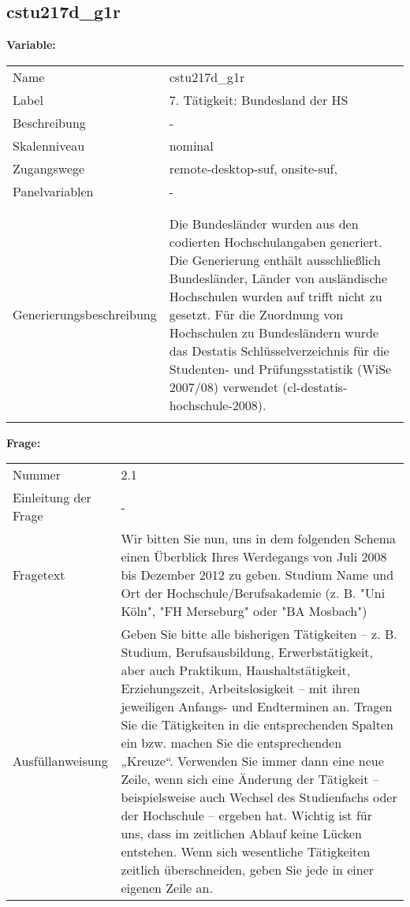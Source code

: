 	
	
	\subsection{cstu217d\_g1r}
	\label{subSection:cstu217d_g1r}

	\noindent\textbf{Variable:}\\
		\begin{tabular}{lL{11.3cm}}
			\label{tableVariable:cstu217d_g1r}
			Name & cstu217d\_g1r \\
			Label & 7. Tätigkeit: Bundesland der HS \\
			Beschreibung & - \\
			Skalenniveau & nominal \\
			Zugangswege &
				remote-desktop-suf,
				onsite-suf,
 \\
			Panelvariablen & -
			 \\
			 \\
 \\
					Generierungsbeschreibung & Die Bundesländer wurden aus den codierten Hochschulangaben generiert. Die Generierung enthält ausschließlich Bundesländer, Länder von ausländische Hochschulen wurden auf trifft nicht zu gesetzt. Für die Zuordnung von Hochschulen zu Bundesländern wurde das Destatis Schlüsselverzeichnis für die Studenten- und Prüfungsstatistik (WiSe 2007/08) verwendet (cl-destatis-hochschule-2008).
				 \\	
			 \\
		\end{tabular}

		\vspace*{1 cm}
		\noindent\textbf{Frage:}\\
		\begin{tabular}{lL{11.3cm}}
			\label{tableQuestion:cstu217d_g1r}
			Nummer & 2.1 \\
			Einleitung der Frage & - \\
			Fragetext & Wir bitten Sie nun, uns in dem folgenden Schema einen Überblick Ihres Werdegangs von Juli 2008 bis Dezember 2012 zu geben.
Studium
Name und Ort der Hochschule/Berufsakademie
(z. B. "Uni Köln", "FH Merseburg" oder "BA Mosbach") \\
			Ausfüllanweisung & Geben Sie bitte alle bisherigen Tätigkeiten – z. B. Studium, Berufsausbildung, Erwerbstätigkeit, aber auch Praktikum, Haushaltstätigkeit,
Erziehungszeit, Arbeitslosigkeit – mit ihren jeweiligen Anfangs- und Endterminen an. Tragen Sie die Tätigkeiten in die entsprechenden Spalten ein bzw. machen Sie die entsprechenden „Kreuze“. Verwenden Sie immer dann eine neue Zeile, wenn sich eine Änderung der Tätigkeit – beispielsweise auch Wechsel des Studienfachs oder der Hochschule – ergeben hat. Wichtig ist für uns, dass im zeitlichen Ablauf keine Lücken entstehen. Wenn sich wesentliche Tätigkeiten zeitlich überschneiden, geben Sie jede in einer eigenen Zeile an. \\
		\end{tabular}





